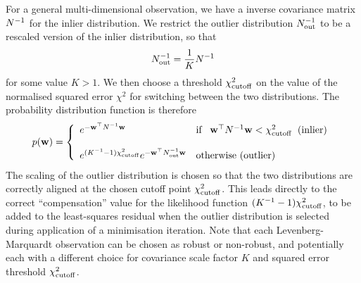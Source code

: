 \documentclass{article}
\begin{document}
For a general multi-dimensional observation, we have a inverse covariance
matrix $N^{-1}$ for the inlier distribution.
We restrict the outlier distribution $N_{\rm out}^{-1}$ to be a rescaled version
of the inlier distribution, so that
\[ N_{\rm out}^{-1} = \frac{1}{K} N^{-1}
\]
for some value $K>1$. We then choose a threshold $\chi_{\rm cutoff}^2$
on the value of the normalised squared error $\chi^2$ for switching between
the two distributions. The probability distribution function is therefore
\[ p({\bf w}) = \left\{ \begin{array}{ll} e^{-{\bf w}^{\top} N^{-1} {\bf w}} &
    \mbox{if}\;\;\;{\bf w}^{\top} N^{-1} {\bf w} < \chi_{\rm cutoff}^2\;\;\mbox{(inlier)} \\&\\
		 e^{(K^{-1} -1)\chi_{\rm cutoff}^2} e^{-{\bf w}^{\top} N_{\rm out}^{-1} {\bf w}}
  & \mbox{otherwise (outlier)} \end{array} \right.
\]
The scaling of the outlier distribution is chosen so that the two distributions
are correctly aligned at the chosen cutoff point $\chi_{\rm cutoff}^2$.
This leads directly to the correct ``compensation'' value for the likelihood
function $(K^{-1} - 1)\chi_{\rm cutoff}^2$, to be added to the least-squares
residual when the outlier distribution is selected during application
of a minimisation iteration.
Note that each Levenberg-Marquardt observation can be chosen as robust
or non-robust, and potentially each with a different choice for
covariance scale factor $K$ and squared error threshold $\chi_{\rm cutoff}^2$.
\end{document}

